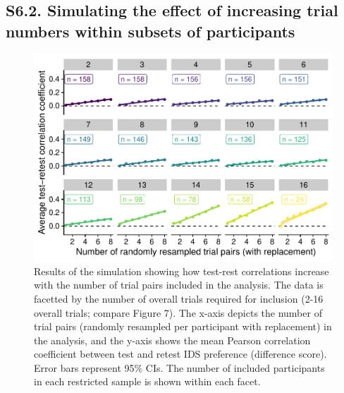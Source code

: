 \documentclass[
  man, donotrepeattitle,floatsintext]{apa6}
\begin{document}
\hypertarget{s6.2.-simulating-the-effect-of-increasing-trial-numbers-within-subsets-of-participants}{%
\subsection{S6.2. Simulating the effect of increasing trial numbers within subsets of participants}\label{s6.2.-simulating-the-effect-of-increasing-trial-numbers-within-subsets-of-participants}}

\begin{figure}
\centering
\includegraphics{MB1T_supplement_files/figure-latex/fig8-1.pdf}
\caption{\label{fig:fig8}Results of the simulation showing how test-rest correlations increase with the number of trial pairs included in the analysis. The data is facetted by the number of overall trials required for inclusion (2-16 overall trials; compare Figure 7). The x-axis depicts the number of trial pairs (randomly resampled per participant with replacement) in the analysis, and the y-axis shows the mean Pearson correlation coefficient between test and retest IDS preference (difference score). Error bars represent 95\% CIs. The number of included participants in each restricted sample is shown within each facet.}
\end{figure}
\end{document}
